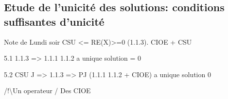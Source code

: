     \subsection{Etude de l'unicité des solutions: conditions suffisantes d'unicité}

        \begin{REM}
            Note de Lundi soir
            CSU <= RE(X)>=0 (1.1.3). CIOE + CSU

            5.1 1.1.3 => 1.1.1 1.1.2 a  unique solution = 0

            5.2 CSU J => 1.1.3 => PJ (1.1.1 1.1.2 + CIOE) a unique solution 0

            /!\textbackslash  Un operateur / Des CIOE
        \end{REM}


% 
